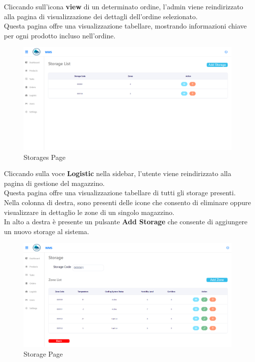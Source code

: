 Cliccando sull'icona \textbf{view} di un determinato ordine, l’admin viene
reindirizzato alla pagina di visualizzazione dei dettagli dell'ordine selezionato.\\
Questa pagina offre una visualizzazione tabellare, mostrando informazioni chiave per ogni prodotto
incluso nell'ordine.

\begin{figure}[H]
    \centering
    \includegraphics[width=\textwidth]{document/sections/img/Storyboard/storagePage.png}
    \caption{Storages Page}
    \label{fig:storagesPage}
\end{figure}

Cliccando sulla voce \textbf{Logistic} nella sidebar, l'utente viene reindirizzato alla pagina di gestione del magazzino.\\
Questa pagina offre una visualizzazione tabellare di tutti gli storage presenti.\\
Nella colonna di destra, sono presenti delle icone che consento di eliminare oppure visualizzare in dettaglio
le zone di un singolo magazzino.\\
In alto a destra è presente un pulsante \textbf{Add Storage} che consente di aggiungere un nuovo storage al sistema.

\begin{figure}[H]
    \centering
    \includegraphics[width=\textwidth]{document/sections/img/Storyboard/viewStorage.png}
    \caption{Storage Page}
    \label{fig:storagePage}
\end{figure}

